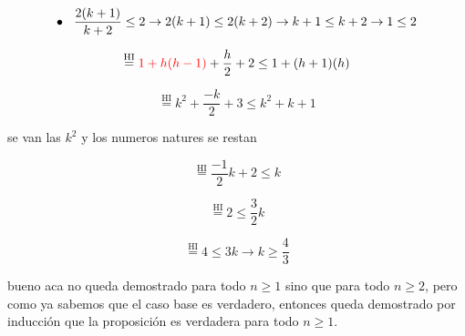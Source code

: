 \begin{ejercicio}
\[
\bullet \hspace{0,3 cm} \frac{2(k+1)}{k+2} \leq 2 \rightarrow  2(k+1) \leq 2(k+2) \rightarrow  k+1 \leq k+2 \rightarrow 1 \leq 2
\]


\[
\stackrel{\text{HI}}{=} \textcolor{red}{1+h(h-1)}+ \frac{h}{2} + 2 \leq 1+(h+1)(h)
\]

\[
\stackrel{\text{HI}}{=} k^2 +\frac{-k}{2} + 3 \leq k^2 + k + 1 
\]

se van las $k^2$ y los numeros natures se restan 

\[
\stackrel{\text{HI}}{=} \frac{-1}{2} k + 2 \leq  k  
\]

\[
\stackrel{\text{HI}}{=} 2 \leq  \frac{3}{2} k  
\]

\[
\stackrel{\text{HI}}{=} 4 \leq 3 k  \rightarrow k \geq \frac{4}{3}
\]

\begin{solucion}
    bueno aca no queda demostrado para todo $n\geq1$ sino que para todo $n\geq2$, pero como ya sabemos que el caso base es verdadero, entonces queda demostrado por inducción que la proposición es verdadera para todo $n\geq1$.
\end{solucion}

\end{ejercicio}